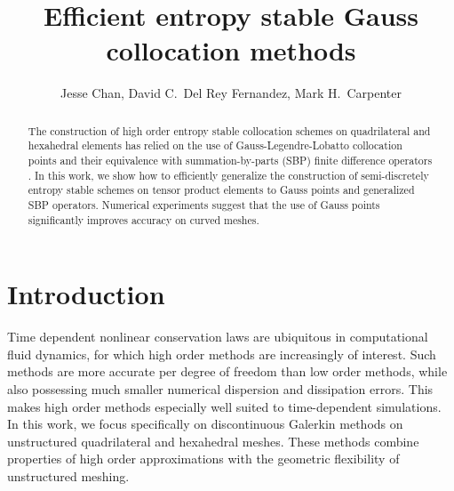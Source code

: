 \documentclass[review,onefignum,onetabnum,final]{siamart171218}
\author{Jesse Chan, David C.\ Del Rey Fernandez, Mark H.\ Carpenter}
\title{Efficient entropy stable Gauss collocation methods}
\begin{document}
\maketitle

\begin{abstract}
The construction of high order entropy stable collocation schemes on quadrilateral and hexahedral elements has relied on the use of Gauss-Legendre-Lobatto collocation points \cite{fisher2013high, carpenter2014entropy, gassner2016split} and their equivalence with summation-by-parts (SBP) finite difference operators \cite{gassner2013skew}.  In this work, we show how to efficiently generalize the construction of semi-discretely entropy stable schemes on tensor product elements to Gauss points and generalized SBP operators.  Numerical experiments suggest that the use of Gauss points significantly improves accuracy on curved meshes.  
\end{abstract}

\section{Introduction}

Time dependent nonlinear conservation laws are ubiquitous in computational fluid dynamics, for which high order methods are increasingly of interest.  Such methods are more accurate per degree of freedom than low order methods, while also possessing much smaller numerical dispersion and dissipation errors.  This makes high order methods especially well suited to time-dependent simulations.  In this work, we focus specifically on discontinuous Galerkin methods on unstructured quadrilateral and hexahedral meshes.  These methods combine properties of high order approximations with the geometric flexibility of unstructured meshing.  %
\end{document}
